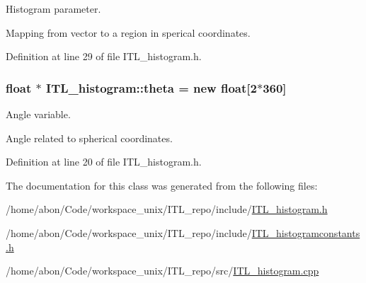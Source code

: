 Histogram parameter. 

Mapping from vector to a region in sperical coordinates. 

Definition at line 29 of file ITL\_\-histogram.h.

\hypertarget{classITL__histogram_a3111dfec91196d7ed491c3552997ba59}{
\subsubsection[{theta}]{\setlength{\rightskip}{0pt plus 5cm}float $\ast$ {\bf ITL\_\-histogram::theta} = new float\mbox{[}2$\ast$360\mbox{]}}}
\label{classITL__histogram_a3111dfec91196d7ed491c3552997ba59}


Angle variable. 

Angle related to spherical coordinates. 

Definition at line 20 of file ITL\_\-histogram.h.



The documentation for this class was generated from the following files:\begin{DoxyCompactItemize}
\item 
/home/abon/Code/workspace\_\-unix/ITL\_\-repo/include/\hyperlink{ITL__histogram_8h}{ITL\_\-histogram.h}\item 
/home/abon/Code/workspace\_\-unix/ITL\_\-repo/include/\hyperlink{ITL__histogramconstants_8h}{ITL\_\-histogramconstants.h}\item 
/home/abon/Code/workspace\_\-unix/ITL\_\-repo/src/\hyperlink{ITL__histogram_8cpp}{ITL\_\-histogram.cpp}\end{DoxyCompactItemize}

